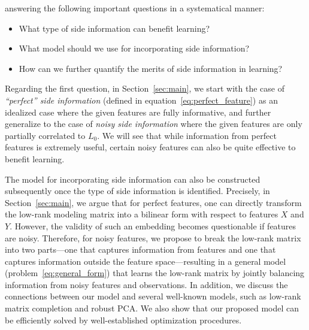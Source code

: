\documentclass[twoside,11pt]{article}
\def\realL{L_0}
\begin{document}
answering the following important questions in a systematical manner:
\begin{itemize}
  \item What type of side information can benefit learning?
  \item What model should we use for incorporating side information?
  \item How can we further quantify the merits of side information in learning?
\end{itemize}
Regarding the first question,
in Section~\ref{sec:main},
we start with the case of {\it ``perfect'' side information} (defined in
equation~\ref{eq:perfect_feature}) as an idealized case where the given features
are fully informative,
and further generalize to the case of {\it noisy side information} %
where the given features are only partially correlated to $\realL$.
We will see that while information from perfect features is extremely useful,
certain noisy features can also be quite effective to benefit learning.

The model for incorporating side information can also be constructed
subsequently once the type of side information is identified.
Precisely, in Section~\ref{sec:main}, we argue that for perfect features,
one can directly transform the
low-rank modeling matrix into a bilinear form with respect to features $X$ and $Y$.
However, the validity of such an embedding becomes questionable if features are noisy.
Therefore, for noisy features, we propose to break the low-rank matrix into two parts---one
that captures information from features and one that captures information outside the
feature space---resulting in a general model (problem~\ref{eq:general_form})
that learns the low-rank matrix by jointly balancing information from noisy features and observations.
In addition, we discuss the connections between our model and several well-known models,
such as low-rank matrix completion and robust PCA.
We also show that our proposed model can be efficiently solved
by well-established optimization procedures.
\end{document}
